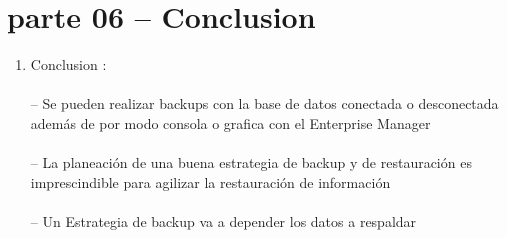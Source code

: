 \section{parte 06 – Conclusion} 

\begin{enumerate}[1.]
	\item Conclusion :
	\\\\-- Se pueden realizar backups con la base de datos conectada o desconectada además de por modo consola o grafica con el Enterprise Manager
	\\\\-- La planeación de una buena estrategia de backup y de restauración es imprescindible para agilizar la restauración de información
	\\\\-- Un Estrategia de backup va a depender los datos a respaldar


\end{enumerate} 

